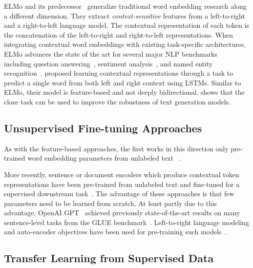 ELMo and its predecessor~\cite{peters-etal:2017:_semi, peters-etal:2018:_deep} generalize traditional word embedding research along a different dimension. They extract \emph{context-sensitive} features from a left-to-right and a right-to-left language model. The contextual representation of each token is the concatenation of the left-to-right and right-to-left representations. When integrating contextual word embeddings with existing task-specific architectures, ELMo advances the state of the art for several major NLP benchmarks~\cite{peters-etal:2018:_deep} including question answering~\cite{rajpurkar-etal:2016:_squad}, sentiment analysis~\cite{socher-etal:2013:_recur}, and named entity recognition~\cite{tjong-de:2003}.
\citet{melamud2016context2vec} proposed learning contextual representations through a task to predict a single word from both left and right context
using LSTMs. Similar to ELMo, their model is feature-based and not deeply bidirectional. 
\citet{fedus2018maskgan} shows that the cloze task can be used to improve the robustness of text generation models. 




\subsection{Unsupervised Fine-tuning Approaches}

As with the feature-based approaches, the first works in this direction only pre-trained word embedding parameters from unlabeled text ~\cite{collobert-weston:2008}.  

More recently, sentence or document encoders which produce contextual token representations have been pre-trained from unlabeled text and fine-tuned for a supervised downstream task~\cite{dai-le:2015:_semi, howard-ruder:2018, radford-etal:2018}.  The advantage of these approaches is that few parameters need to be learned from scratch. At least partly due to this advantage, OpenAI GPT~\cite{radford-etal:2018} achieved previously state-of-the-art results on many sentence-level tasks from the GLUE benchmark~\cite{wang-etal:2018:_glue}.  Left-to-right language modeling and auto-encoder objectives have been used for pre-training such models~\cite{howard-ruder:2018, radford-etal:2018,dai-le:2015:_semi}.





\subsection{Transfer Learning from Supervised Data}

